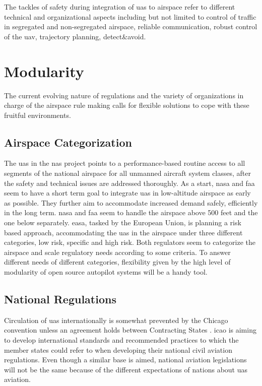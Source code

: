 The tackles of safety during integration of \gls{uas} to airspace refer to different technical 
and organizational aspects including but not limited to control of traffic in segregated and 
non-segregated airspace, reliable communication, robust control of the \gls{uav}, trajectory planning, detect\&avoid.


\section{Modularity}\label{ch2:modularity}

The current evolving nature of regulations and the variety of organizations in charge 
of the airspace rule making calls for flexible solutions to cope with these fruitful environments. 

\subsection{Airspace Categorization}
The \gls{uas} in the \gls{nas} project points to a performance-based routine access to 
all segments of the national airspace for all unmanned aircraft system classes, after the 
safety and technical issues are addressed thoroughly. As a start, \gls{nasa} and faa 
seem to have a short term goal to integrate \gls{uas} in low-altitude airspace as early 
as possible. They further aim to accommodate increased demand safely, efficiently in 
the long term. \gls{nasa} and faa seem to handle the airspace above 500 feet and the 
one below separately. easa, tasked by the European Union, is planning a risk based approach, 
accommodating the \gls{uas} in the airspace under three different categories, low risk, 
specific and high risk. Both regulators seem to categorize the airspace and scale regulatory 
needs according to some criteria. To answer different needs of different categories, flexibility 
given by the high level of modularity of open source autopilot systems will be a handy tool. 

\subsection{National Regulations}
Circulation of \gls{uas} internationally is somewhat prevented by the Chicago convention 
unless an agreement holds between Contracting States \cite{A_NPA_EASA2015}. \gls{icao} is aiming 
to develop international standards and recommended practices to which the member states 
could refer to when developing their national civil aviation regulations. Even though a similar 
base is aimed, national aviation legislations will not be the same because of the different 
expectations of nations about \gls{uas} aviation. 

